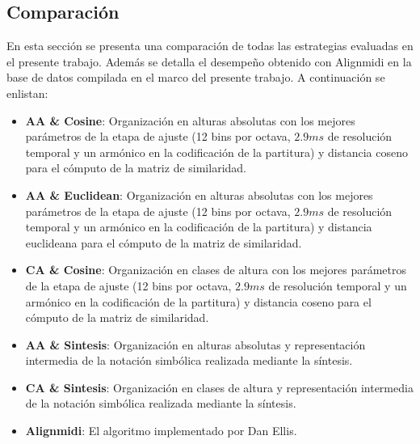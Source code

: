 \documentclass
  [ams,pdfout]%
	{aeslac}
\begin{document}
\subsection{Comparación}

En esta sección se presenta una comparación de todas las estrategias evaluadas en el presente trabajo. Además se detalla el desempeño obtenido con Alignmidi \cite{alignmidi} en la base de datos compilada en el marco del presente trabajo. A continuación se enlistan: 

\begin{itemize}

\item \textbf{AA \& Cosine}: Organización en alturas absolutas con los mejores parámetros de la etapa de ajuste (12 bins por octava, $2.9ms$ de resolución temporal y un armónico en la codificación de la partitura) y distancia coseno para el cómputo de la matriz de similaridad.
\item \textbf{AA \& Euclidean}: Organización en alturas absolutas con los mejores parámetros de la etapa de ajuste (12 bins por octava, $2.9ms$ de resolución temporal y un armónico en la codificación de la partitura) y distancia euclideana para el cómputo de la matriz de similaridad.
\item \textbf{CA \& Cosine}: Organización en clases de altura con los mejores parámetros de la etapa de ajuste (12 bins por octava, $2.9ms$ de resolución temporal y un armónico en la codificación de la partitura) y distancia coseno para el cómputo de la matriz de similaridad.
\item \textbf{AA \& Sintesis}: Organización en alturas absolutas y representación intermedia de la notación simbólica realizada mediante la síntesis.  
\item \textbf{CA \& Sintesis}: Organización en clases de altura y representación intermedia de la notación simbólica realizada mediante la síntesis.
\item \textbf{Alignmidi}: El algoritmo implementado por Dan Ellis.
 

\end{itemize}
\end{document}
